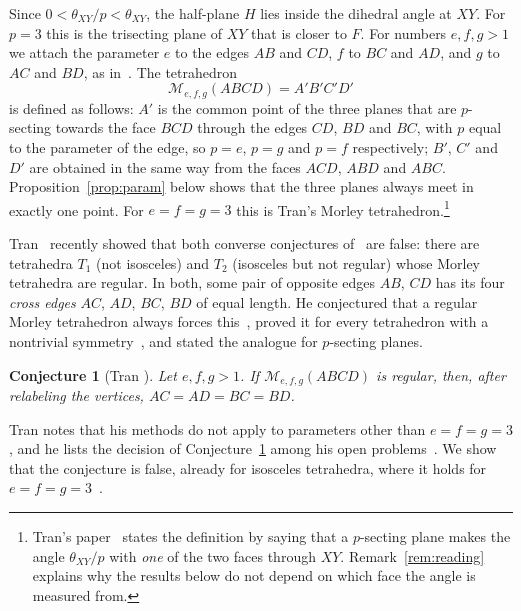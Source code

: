 \documentclass[11pt]{amsart}
\newtheorem{conjecture}[theorem]{Conjecture}
\theoremstyle{definition}
\theoremstyle{remark}
\numberwithin{equation}{section}
\newcommand{\M}{\mathcal{M}}
\begin{document}
Since $0<\theta_{XY}/p<\theta_{XY}$, the half-plane $H$ lies inside the dihedral angle at $XY$. For $p=3$ this is the trisecting plane of $XY$ that is closer to $F$. For numbers $e,f,g>1$ we attach the parameter $e$ to the edges $AB$ and $CD$, $f$ to $BC$ and $AD$, and $g$ to $AC$ and $BD$, as in~\cite[Theorem~6]{Tr21}. The tetrahedron
\[
\M_{e,f,g}(ABCD)=A'B'C'D'
\]
is defined as follows: $A'$ is the common point of the three planes that are $p$-secting towards the face $BCD$ through the edges $CD$, $BD$ and $BC$, with $p$ equal to the parameter of the edge, so $p=e$, $p=g$ and $p=f$ respectively; $B'$, $C'$ and $D'$ are obtained in the same way from the faces $ACD$, $ABD$ and $ABC$. Proposition~\ref{prop:param} below shows that the three planes always meet in exactly one point. For $e=f=g=3$ this is Tran's Morley tetrahedron.\footnote{Tran's paper~\cite{Tr26a} states the definition by saying that a $p$-secting plane makes the angle $\theta_{XY}/p$ with \emph{one} of the two faces through $XY$. Remark~\ref{rem:reading} explains why the results below do not depend on which face the angle is measured from.}

Tran~\cite{Tr26a} recently showed that both converse conjectures of~\cite{Tr21} are false: there are tetrahedra $T_1$ (not isosceles) and $T_2$ (isosceles but not regular) whose Morley tetrahedra are regular. In both, some pair of opposite edges $AB$, $CD$ has its four \emph{cross edges} $AC$, $AD$, $BC$, $BD$ of equal length. He conjectured that a regular Morley tetrahedron always forces this~\cite[Conjecture~8.1]{Tr26a}, proved it for every tetrahedron with a nontrivial symmetry~\cite[Corollary~11.6]{Tr26a}, and stated the analogue for $p$-secting planes.

\begin{conjecture}[Tran {\cite[Conjecture~8.6]{Tr26a}}]\label{conj:tran}
Let $e,f,g>1$. If $\M_{e,f,g}(ABCD)$ is regular, then, after relabeling the vertices, $AC=AD=BC=BD$.
\end{conjecture}

Tran notes that his methods do not apply to parameters other than $e=f=g=3$, and he lists the decision of Conjecture~\ref{conj:tran} among his open problems~\cite[Section~18.5 and Problem~8 of Section~19]{Tr26a}. We show that the conjecture is false, already for isosceles tetrahedra, where it holds for $e=f=g=3$~\cite[Theorems~10.1 and~10.3]{Tr26a}.
\end{document}
